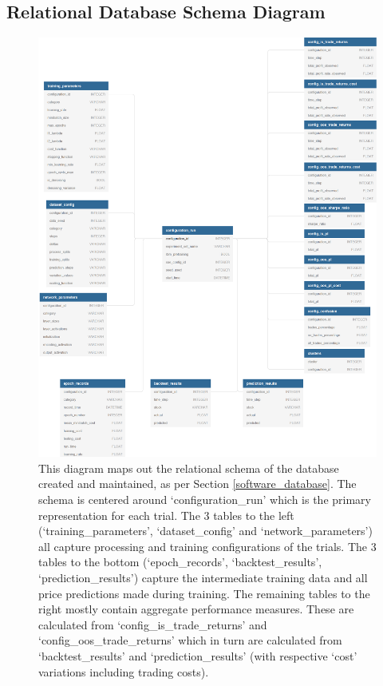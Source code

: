 \documentclass[a4paper,11pt,oneside]{article}
\theoremstyle{plain}
\theoremstyle{definition}
\begin{document}
	
	
	
	
	
	
	\newpage

	
	

	
		
	\subsection{Relational Database Schema Diagram}\label{appendix_database_schema}
	
	\begin{figure}[H]
		\centering 
		\includegraphics[scale=0.55]{images/results/8_appendix/relational_schema.png}
		\caption[Relational Database Schema Diagram]{This diagram maps out the relational schema of the database created and maintained, as per Section \ref{software_database}. The schema is centered around `configuration\_run' which is the primary representation for each trial. The 3 tables to the left (`training\_parameters', `dataset\_config' and `network\_parameters') all capture processing and training configurations of the trials. The 3 tables to the bottom (`epoch\_records', `backtest\_results', `prediction\_results') capture the intermediate training data and all price predictions made during training. The remaining tables to the right mostly contain aggregate performance measures. These are calculated from `config\_is\_trade\_returns' and `config\_oos\_trade\_returns' which in turn are calculated from `backtest\_results' and `prediction\_results' (with respective `cost' variations including trading costs). }
		\label{figure-database_schema}
	\end{figure}
	
\end{document}
